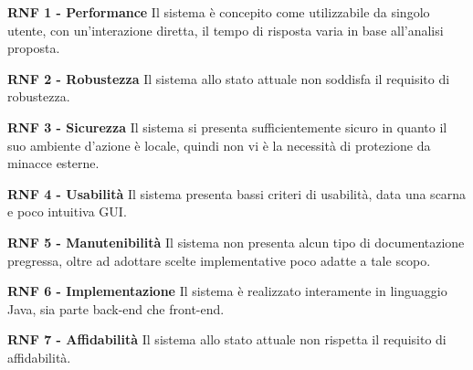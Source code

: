 		\begin{list}{-}{}
			
			\item \textbf{RNF 1 - Performance}\newline 
			Il sistema è concepito come utilizzabile da singolo utente, con un'interazione diretta, il tempo di risposta varia in base all'analisi proposta.
			\newline 
			\item \textbf{RNF 2 - Robustezza}
			\newline  Il sistema allo stato attuale non soddisfa il requisito di robustezza.
			\newline
			\item \textbf{RNF 3 - Sicurezza}
			\newline Il sistema si presenta sufficientemente sicuro in quanto il suo ambiente d'azione è locale, quindi non vi è la necessità di protezione da minacce esterne.
			\newline 
			\item \textbf{RNF 4 - Usabilità}
			\newline Il sistema presenta bassi criteri di usabilità, data una scarna e poco intuitiva GUI.
			\newline 
			\item \textbf{RNF 5 - Manutenibilità}\newline 
			Il sistema non presenta alcun tipo di documentazione pregressa, oltre ad adottare scelte implementative poco adatte a tale scopo.
			\newline  
			\item \textbf{RNF 6 - Implementazione}
			\newline Il sistema è realizzato interamente in linguaggio Java, sia parte back-end che front-end.
			\newline 
			\item \textbf{RNF 7 - Affidabilità}
			\newline  Il sistema allo stato attuale non rispetta il requisito di affidabilità.
	  \end{list}
